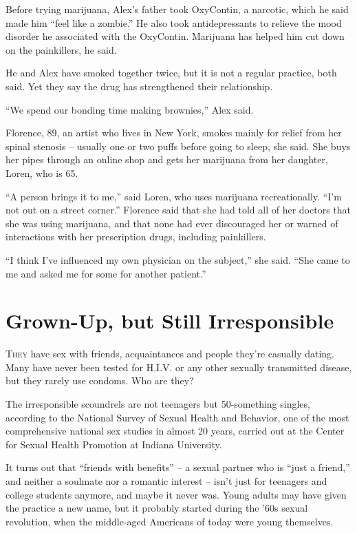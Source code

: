 ﻿\documentclass[12pt]{article}
\begin{document}
Before trying marijuana, Alex's father took OxyContin, a narcotic, which he said made him ``feel
like a zombie.'' He also took antidepressants to relieve the mood disorder he associated with the
OxyContin. Marijuana has helped him cut down on the painkillers, he said.

He and Alex have smoked together twice, but it is not a regular practice, both said. Yet they say
the drug has strengthened their relationship.

``We spend our bonding time making brownies,'' Alex said.

Florence, 89, an artist who lives in New York, smokes mainly for relief from her spinal stenosis --
usually one or two puffs before going to sleep, she said. She buys her pipes through an online shop
and gets her marijuana from her daughter, Loren, who is 65.

``A person brings it to me,'' said Loren, who uses marijuana recreationally. ``I'm not out on a
street corner.'' Florence said that she had told all of her doctors that she was using marijuana,
and that none had ever discouraged her or warned of interactions with her prescription drugs,
including painkillers.

``I think I've influenced my own physician on the subject,'' she said. ``She came to me and asked me
for some for another patient.''

\section{Grown-Up, but Still Irresponsible}

\lettrine{T}{hey} have sex with friends, acquaintances and people they're
casually dating. Many have never been tested for H.I.V. or any other sexually transmitted disease,
but they rarely use condoms. Who are they?

The irresponsible scoundrels are not teenagers but 50-something singles, according to the National
Survey of Sexual Health and Behavior, one of the most comprehensive national sex studies in almost
20 years, carried out at the Center for Sexual Health Promotion at Indiana University.

It turns out that ``friends with benefits'' -- a sexual partner who is ``just a friend,'' and
neither a soulmate nor a romantic interest -- isn't just for teenagers and college students anymore,
and maybe it never was. Young adults may have given the practice a new name, but it probably started
during the '60s sexual revolution, when the middle-aged Americans of today were young themselves.
\end{document}

